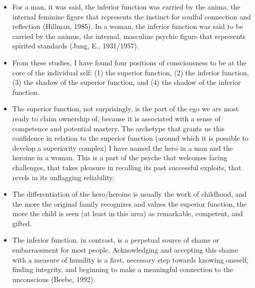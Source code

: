 \begin{itemize}
Before we can explore the archetypal characteristics of this core axis of the
shadow, and of the spine of greater integrity that it shadows, we have to get
better acquainted with how an archetype, a figure of the unconscious, can be
associated with a function of consciousness, which seems to many people like a
paradox. Let me trace my own history of developing this idea.

\item

For a man, it was said, the inferior function was carried by the anima, the
internal feminine figure that represents the instinct for soulful connection
and reflection (Hillman, 1985). In a woman, the inferior function was said to
be carried by the animus, the internal, masculine psychic figure that
represents spirited standards (Jung, E., 1931/1957).

\item

From these studies, I have found four positions of consciousness to be at the
core of the individual self: (1) the superior function, (2) the inferior
function, (3) the shadow of the superior function, and (4) the shadow of the
inferior function.

\item

The superior function, not surprisingly, is the part of the ego we are most
ready to claim ownership of, because it is associated with a sense of
competence and potential mastery. The archetype that grants us this confidence
in relation to the superior function (around which it is possible to develop a
superiority complex) I have named the hero in a man and the heroine in a woman.
This is a part of the psyche that welcomes facing challenges, that takes
pleasure in recalling its past successful exploits, that revels in its
unflagging reliability.

\item

The differentiation of the hero/heroine is usually the work of childhood, and
the more the original family recognizes and values the superior function, the
more the child is seen (at least in this area) as remarkable, competent, and
gifted.

\item

The inferior function, in contrast, is a perpetual source of shame or
embarrassment for most people. Acknowledging and accepting this shame with a
measure of humility is a first, necessary step towards knowing oneself, finding
integrity, and beginning to make a meaningful connection to the unconscious
(Beebe, 1992).


\end{itemize}
